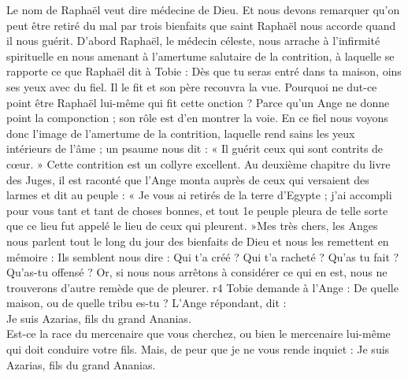 \documentclass[twoside]{article}
\begin{document}
\begin{paracol}[1]{2}
{		Le nom de Raphaël veut dire médecine de Dieu. Et nous devons remarquer qu’on peut être retiré du mal par trois bienfaits que saint Raphaël nous accorde quand il nous guérit. D’abord Raphaël, le médecin céleste, nous arrache à l’infirmité spirituelle en nous amenant à l’amertume salutaire de la contrition, à laquelle se rapporte ce que Raphaël dit à Tobie : Dès que tu seras entré dans ta maison, oins ses yeux avec du fiel. Il le fit et son père recouvra la vue. Pourquoi ne dut-ce point être Raphaël lui-même qui fit cette onction ? Parce qu’un Ange ne donne point la componction ; son rôle est d’en montrer la voie. En ce fiel nous voyons donc l’image de l’amertume de la contrition, laquelle rend sains les yeux intérieurs de l’âme ; un psaume nous dit : « Il guérit ceux qui sont contrits de cœur. » Cette contrition est un collyre excellent. Au deuxième chapitre du livre des Juges, il est raconté que l’Ange monta auprès de ceux qui versaient des larmes et dit au peuple : « Je vous ai retirés de la terre d’Egypte ; j’ai accompli pour vous tant et tant de choses bonnes, et tout 1e peuple pleura de telle sorte que ce lieu fut appelé le lieu de ceux qui pleurent. »Mes très chers, les Anges nous parlent tout le long du jour des bienfaits de Dieu et nous les remettent en mémoire : Ils semblent nous dire : Qui t’a créé ? Qui t’a racheté ? Qu’as tu fait ? Qu’as-tu offensé ? Or, si nous nous arrêtons à considérer ce qui en est, nous ne trouverons d’autre remède que de pleurer.
	}
	{r4}
	{\rr Tobie demande à l’Ange : De quelle maison, ou de quelle tribu es-tu ? L’Ange répondant, dit :\\
	\GreSpecial{*} Je suis Azarias, fils du grand Ananias.\\
	\vv Est-ce la race du mercenaire que vous cherchez, ou bien le mercenaire lui-même qui doit conduire votre fils. Mais, de peur que je ne vous rende inquiet :
	\rr Je suis Azarias, fils du grand Ananias.}


\end{paracol}
\end{document}
